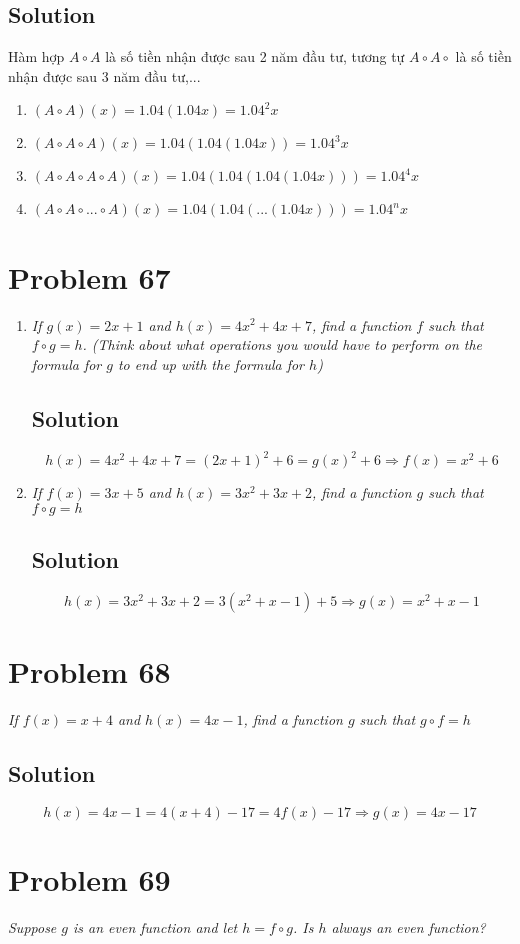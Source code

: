 \documentclass[11pt]{article}
\newcommand{\soln}{\subsection*}
\newcommand{\qn}{\textit}
\begin{document}
\soln{Solution}
Hàm hợp $A \circ A$ là số tiền nhận được sau 2 năm đầu tư, tương tự $A \circ A \circ$ là số tiền nhận được sau 3 năm đầu tư,...
\begin{enumerate}
	\item $(A \circ A)(x) = 1.04(1.04x)=1.04^2x$
	
	\item $(A \circ A \circ A)(x) = 1.04(1.04(1.04x))=1.04^3x$
	
	\item $(A \circ A \circ A \circ A)(x) = 1.04(1.04(1.04(1.04x)))=1.04^4x$
	
	\item $(A \circ A \circ... \circ A)(x) = 1.04(1.04(...(1.04x)))=1.04^nx$
\end{enumerate}

\section*{Problem 67}

\begin{enumerate}
	\item \qn{If $g(x)=2x+1$ and $h(x)=4x^2+4x+7$, find a function $f$ such that $f \circ g=h$. (Think about what operations you would have to perform on the formula for $g$ to end up with the formula for $h$)}
	\soln{Solution}
	$$h(x)=4x^2+4x+7=(2x+1)^2+6=g(x)^2+6 \Rightarrow f(x)=x^2+6$$
	
	\item \qn{If $f(x)=3x+5$ and $h(x)=3x^2+3x+2$, find a function $g$ such that $f \circ g=h$}
	\soln{Solution}
	$$h(x)=3x^2+3x+2=3(x^2+x-1)+5 \Rightarrow g(x)=x^2+x-1$$
\end{enumerate}

\section*{Problem 68}

\qn{If $f(x)=x+4$ and $h(x)=4x-1$, find a function $g$ such that $g \circ f=h$}

\soln{Solution}
$$h(x)=4x-1=4(x+4)-17=4f(x)-17 \Rightarrow g(x)=4x-17$$

\section*{Problem 69}

\qn{Suppose $g$ is an even function and let $h=f \circ g$. Is $h$ always an even function?}
\end{document}
